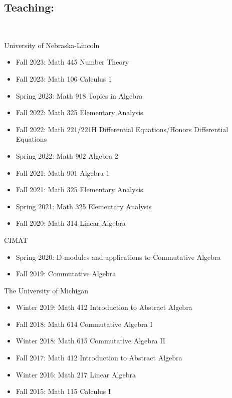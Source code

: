 \documentclass[12pt]{amsart}
\begin{document}
\subsection*{Teaching:}

\




\hspace{-5mm} University of Nebraska-Lincoln
\begin{itemize}[leftmargin=9mm]
	\item Fall 2023: Math 445 Number Theory
	\item Fall 2023: Math 106 Calculus 1
	\item Spring 2023: Math 918 Topics in Algebra
	\item Fall 2022: Math 325 Elementary Analysis
	\item Fall 2022: Math 221/221H Differential Equations/Honors Differential Equations
	\item Spring 2022: Math 902 Algebra 2
	\item Fall 2021: Math 901 Algebra 1
	\item Fall 2021: Math 325 Elementary Analysis
	\item Spring 2021: Math 325 Elementary Analysis
	\item Fall 2020: Math 314 Linear Algebra
\end{itemize}
	
	
	
\hspace{-5mm} CIMAT
\begin{itemize}	[leftmargin=9mm]
	\item Spring 2020: D-modules and applications to Commutative Algebra
	\item Fall 2019: Commutative Algebra
\end{itemize}
	
\hspace{-5mm} The University of Michigan
\begin{itemize}	[leftmargin=9mm]
	\item Winter 2019: Math 412 Introduction to Abstract Algebra
	\item Fall 2018: Math 614 Commutative Algebra I
	\item Winter 2018: Math 615 Commutative Algebra II
	\item Fall 2017: Math 412 Introduction to Abstract Algebra
	\item Winter 2016: Math 217 Linear Algebra
	\item Fall 2015: Math 115 Calculus I
\end{itemize}
\end{document}
